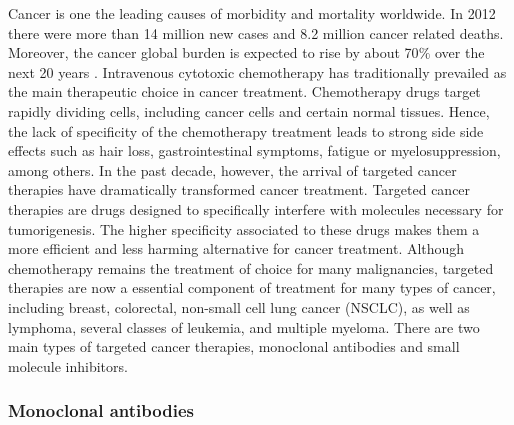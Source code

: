 \documentclass[11pt, b5paper,twoside]{tesi_upf}
\begin{document}
\par Cancer is one the leading causes of morbidity and mortality worldwide. In 2012 there were more than 14 million new cases and 8.2 million cancer related deaths. Moreover, the cancer global burden is expected to rise by about 70$\%$ over the next 20 years \cite{WHO_CANCER}. Intravenous cytotoxic chemotherapy has traditionally prevailed as the main therapeutic choice in cancer treatment. Chemotherapy drugs target rapidly dividing cells, including cancer cells and certain normal tissues.  Hence, the lack of specificity of the chemotherapy treatment leads to strong side side effects such as hair loss, gastrointestinal symptoms, fatigue or myelosuppression, among others.  In the past decade, however, the arrival of targeted cancer therapies have dramatically transformed cancer treatment. Targeted cancer therapies are drugs designed to specifically interfere with molecules necessary for tumorigenesis. The higher specificity associated to these drugs makes them a more efficient and less harming alternative for cancer treatment. Although chemotherapy remains the treatment of choice for many malignancies, targeted therapies are now a essential component of treatment for many types of cancer, including breast, colorectal, non-small cell lung cancer (NSCLC), as well as lymphoma, several classes of leukemia, and multiple myeloma. There are two main types of targeted cancer therapies, monoclonal antibodies and small molecule inhibitors.

\subsubsection{Monoclonal antibodies}
\end{document}
